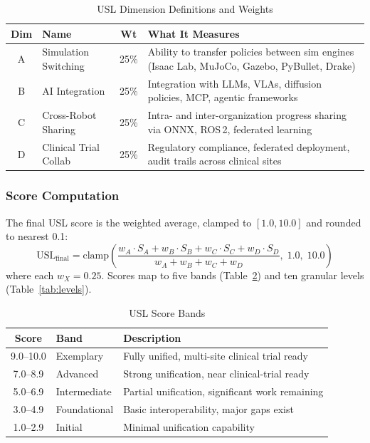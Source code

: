 \documentclass[11pt,a4paper]{article}
\begin{document}
\begin{table}[H]
\centering
\caption{USL Dimension Definitions and Weights}
\label{tab:dimensions}
\small
\begin{tabularx}{\textwidth}{c l c X}
\toprule
\textbf{Dim} & \textbf{Name} & \textbf{Wt} & \textbf{What It Measures} \\
\midrule
A & Simulation Switching & 25\% & Ability to transfer policies between sim engines (Isaac Lab, MuJoCo, Gazebo, PyBullet, Drake) \\
B & AI Integration & 25\% & Integration with LLMs, VLAs, diffusion policies, MCP, agentic frameworks \\
C & Cross-Robot Sharing & 25\% & Intra- and inter-organization progress sharing via ONNX, ROS\,2, federated learning \\
D & Clinical Trial Collab & 25\% & Regulatory compliance, federated deployment, audit trails across clinical sites \\
\bottomrule
\end{tabularx}
\end{table}

\subsubsection{Score Computation}
The final USL score is the weighted average, clamped to $[1.0, 10.0]$ and rounded to nearest 0.1:
\begin{equation}
\text{USL}_{\text{final}} = \text{clamp}\!\left(\frac{w_A \cdot S_A + w_B \cdot S_B + w_C \cdot S_C + w_D \cdot S_D}{w_A + w_B + w_C + w_D},\; 1.0,\; 10.0\right)
\label{eq:usl}
\end{equation}
where each $w_X = 0.25$. Scores map to five bands (Table~\ref{tab:bands}) and ten granular levels (Table~\ref{tab:levels}).

\begin{table}[H]
\centering
\caption{USL Score Bands}
\label{tab:bands}
\begin{tabular}{c l l}
\toprule
\textbf{Score} & \textbf{Band} & \textbf{Description} \\
\midrule
9.0--10.0 & Exemplary & Fully unified, multi-site clinical trial ready \\
7.0--8.9 & Advanced & Strong unification, near clinical-trial ready \\
5.0--6.9 & Intermediate & Partial unification, significant work remaining \\
3.0--4.9 & Foundational & Basic interoperability, major gaps exist \\
1.0--2.9 & Initial & Minimal unification capability \\
\bottomrule
\end{tabular}
\end{table}
\end{document}
